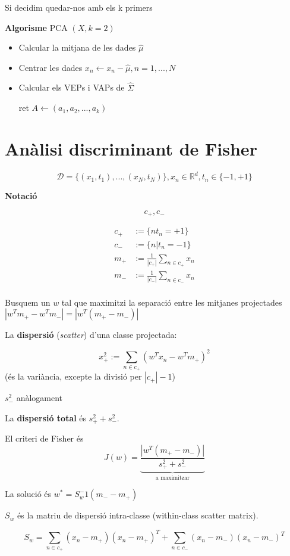 \documentclass[a4paper]{article}
\begin{document}
	Si decidim quedar-nos amb els k primers 
	
	
	\textbf{Algorisme} PCA $(X, k = 2)$
	
	\begin{itemize}
		\item Calcular la mitjana de les dades $\hat{\mu}$
		\item Centrar les dades $x_n \leftarrow x_n - \hat{\mu}, n = 1, ..., N$
		\item Calcular els VEPs i VAPs de $\hat{\Sigma}$
		
		ret $A \leftarrow (a_1, a_2, ..., a_k)$
	\end{itemize}
	
	\section{Anàlisi discriminant de Fisher}
	\[ \mathcal{D} = \{(x_1, t_1), ..., (x_N, t_N)\}, x_n \in \mathbb{R}^d, t_n \in \{-1, +1 \} \]
	
	
	\textbf{Notació}
	
	\[ c_+, c_- \]
	
	\begin{equation}
		\begin{aligned}
			c_+ &:= \{ n  t_n = +1 \} \\
			c_- &:= \{ n | t_n = -1 \} \\
			m_+ &:= \frac{1}{|c_+|} \sum_{n\in c_+} x_n \\
			m_- &:= \frac{1}{|c_-|} \sum_{n\in c_-} x_n \\
		\end{aligned}
	\end{equation}
	
	Busquem un $w$ tal que maximitzi la separació entre les mitjanes projectades $|w^Tm_+ - w^Tm_-| = |w^T(m_+ - m_-)|$
	
	La \textbf{dispersió} (\emph{scatter}) d'una classe projectada:
	
	\[ x_+^2 := \sum_{n \in c_+} (w^Tx_n - w^Tm_+)^2 \]
	(és la variància, excepte la divisió per $|c_+| - 1$)

	$s_-^2$ anàlogament
	
	La \textbf{dispersió total} és $s_+^2 + s_-^2$.
	
	El criteri de Fisher és \[ J(w) = \underbrace{\frac{|w^T(m_+-m_-)|}{s_+^2 + s_-^2}}_\text{a maximitzar} \]
	
	La solució és $w^* = S_w^-1(m_- - m_+)$
	
	$S_w$ és la matriu de dispersió intra-classe (within-class scatter matrix).
	
	\[ S_w = \sum_{n \in c_+} (x_n - m_+)(x_n - m_+)^T + \sum_{n \in c_-} (x_n - m_-)(x_n - m_-)^T \]
	
\end{document}
